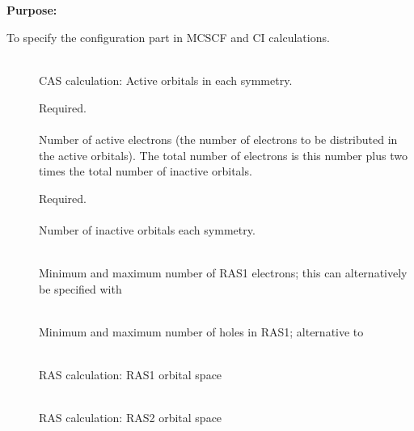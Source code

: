 \pagebreak[3]
\subsection{\label{ref-wavinp}}

{\bf Purpose:}

To specify the configuration part in MCSCF and CI calculations.

\begin{description}
\item[]
   \\
  CAS calculation: Active orbitals in each symmetry.

\item[]
  Required.\\
   \\
  Number of active electrons (the number of
  electrons to be distributed in the active orbitals).
  The total number of electrons is this number
  plus two times the total number of inactive orbitals.

\item[]
  Required.\\
   \\
  Number of inactive orbitals each symmetry.

\item[]
    \\
   Minimum and maximum number of RAS1 electrons; this can alternatively
   be specified with 

\item[]
   \\
  Minimum and maximum number of holes in RAS1; alternative
  to 

\item[]
    \\
   RAS calculation: RAS1 orbital space

\item[]
    \\
   RAS calculation: RAS2 orbital space


\end{description}
